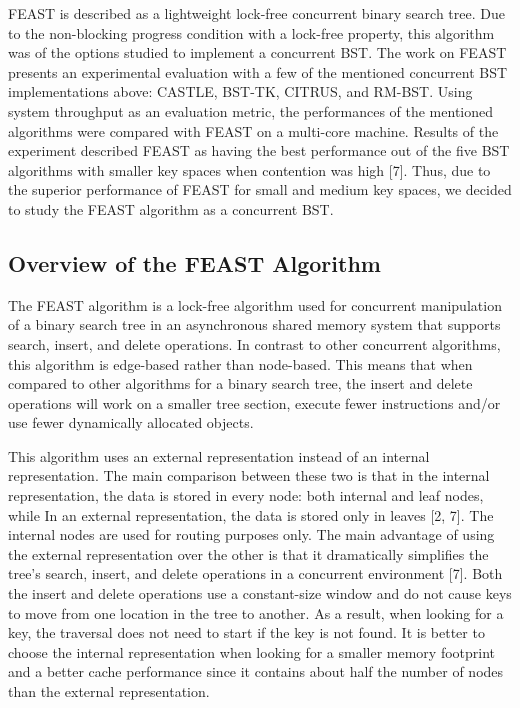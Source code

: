 \documentclass[conference]{IEEEtran}
\begin{document}
FEAST is described as a lightweight lock-free concurrent binary search tree. Due to the non-blocking progress condition with a lock-free property, this algorithm was of the options studied to implement a concurrent BST. The work on FEAST presents an experimental evaluation with a few of the mentioned concurrent BST implementations above: CASTLE, BST-TK, CITRUS, and RM-BST. Using system throughput as an evaluation metric, the performances of the mentioned algorithms were compared with FEAST on a multi-core machine. Results of the experiment described FEAST as having the best performance out of the five BST algorithms with smaller key spaces when contention was high [7]. Thus, due to the superior performance of FEAST for small and medium key spaces, we decided to study the FEAST algorithm as a concurrent BST.

\subsection{Overview of the FEAST Algorithm}
The FEAST algorithm is a lock-free algorithm used for concurrent manipulation of a binary search tree in an asynchronous shared memory system that supports search, insert, and delete operations. In contrast to other concurrent algorithms, this algorithm is edge-based rather than node-based. This means that when compared to other algorithms for a binary search tree, the insert and delete operations will work on a smaller tree section, execute fewer instructions and/or use fewer dynamically allocated objects. 

This algorithm uses an external representation instead of an internal representation. The main comparison between these two is that in the internal representation, the data is stored in every node: both internal and leaf nodes, while In an external representation, the data is stored only in leaves [2, 7]. The internal nodes are used for routing purposes only. The main advantage of using the external representation over the other is that it dramatically simplifies the tree's search, insert, and delete operations in a concurrent environment [7]. Both the insert and delete operations use a constant-size window and do not cause keys to move from one location in the tree to another. As a result, when looking for a key, the traversal does not need to start if the key is not found. It is better to choose the internal representation when looking for a smaller memory footprint and a better cache performance since it contains about half the number of nodes than the external representation.
\end{document}

